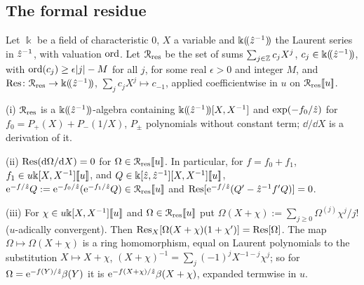 \subsection{The formal residue}
\label{sec:fsp-res}

\begin{lem}
\label{lem:fsp-res}
Let $\Bbbk$ be a field of characteristic $0$, $X$ a variable and $\Bbbk(\!(\hat{z}^{-1})\!)$ the Laurent series in $\hat{z}^{-1}$, with valuation $\operatorname{ord}$. Let $\mathcal{R}_{\mathrm{res}}$ be the set of sums $\sum_{j\in\mathbb{Z}}c_jX^j$, $c_j\in\Bbbk(\!(\hat{z}^{-1})\!)$, with $\operatorname{ord}(c_j)\geq\epsilon|j|-M$ for all $j$, for some real $\epsilon>0$ and integer $M$, and $\operatorname*{Res}\colon\mathcal{R}_{\mathrm{res}}\to\Bbbk(\!(\hat{z}^{-1})\!)$, $\sum_jc_jX^j\mapsto c_{-1}$, applied coefficientwise in $u$ on $\mathcal{R}_{\mathrm{res}}[\![ u ]\!]$.

(i) $\mathcal{R}_{\mathrm{res}}$ is a $\Bbbk(\!(\hat{z}^{-1})\!)$-algebra containing $\Bbbk(\!(\hat{z}^{-1})\!)[X,X^{-1}]$ and $\exp(-f_0/\hat{z})$ for $f_0=P_+(X)+P_-(1/X)$, $P_\pm$ polynomials without constant term; $\dd/\dd X$ is a derivation of it.

(ii) $\operatorname*{Res}(\mathrm{d}\Omega/\mathrm{d} X)=0$ for $\Omega\in\mathcal{R}_{\mathrm{res}}[\![ u ]\!]$. In particular, for $f=f_0+f_1$, $f_1\in u\Bbbk[X,X^{-1}][\![ u ]\!]$, and $Q\in\Bbbk[\hat{z},\hat{z}^{-1}][X,X^{-1}][\![ u ]\!]$, $\mathrm{e}^{-f/\hat{z}}Q:=\mathrm{e}^{-f_0/\hat{z}}(\mathrm{e}^{-f_1/\hat{z}}Q)\in\mathcal{R}_{\mathrm{res}}[\![ u ]\!]$ and $\operatorname*{Res}[\mathrm{e}^{-f/\hat{z}}(Q'-\hat{z}^{-1}f'Q)]=0$.

(iii) For $\chi\in u\Bbbk[X,X^{-1}][\![ u ]\!]$ and $\Omega\in\mathcal{R}_{\mathrm{res}}[\![ u ]\!]$ put $\Omega(X+\chi):=\sum_{j\geq0}\Omega^{(j)}\chi^j/j!$ ($u$-adically convergent). Then $\operatorname*{Res}_X[\Omega(X+\chi)(1+\chi')]=\operatorname*{Res}[\Omega]$. The map $\Omega\mapsto\Omega(X+\chi)$ is a ring homomorphism, equal on Laurent polynomials to the substitution $X\mapsto X+\chi$, $(X+\chi)^{-1}=\sum_j(-1)^jX^{-1-j}\chi^j$; so for $\Omega=\mathrm{e}^{-f(Y)/\hat{z}}\beta(Y)$ it is $\mathrm{e}^{-f(X+\chi)/\hat{z}}\beta(X+\chi)$, expanded termwise in $u$.
\end{lem}

